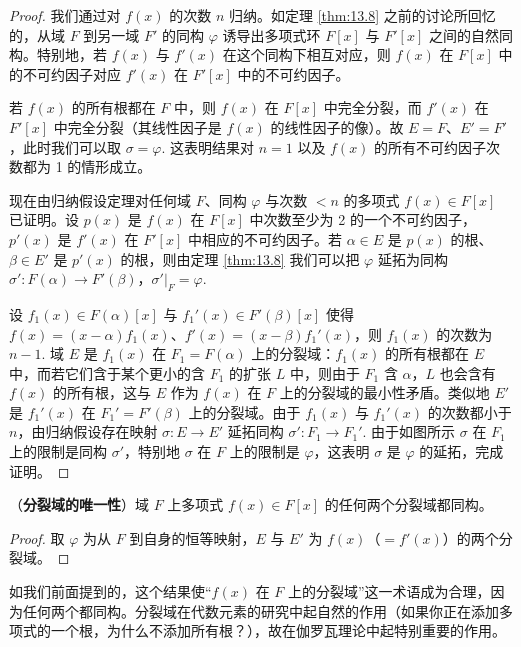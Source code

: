 \begin{proof}
我们通过对 \(f(x)\) 的次数 \(n\) 归纳。如定理 \ref{thm:13.8} 之前的讨论所回忆的，从域 \(F\) 到另一域 \(F'\) 的同构 \(\varphi\) 诱导出多项式环 \(F[x]\) 与 \(F'[x]\) 之间的自然同构。特别地，若 \(f(x)\) 与 \(f'(x)\) 在这个同构下相互对应，则 \(f(x)\) 在 \(F[x]\) 中的不可约因子对应 \(f'(x)\) 在 \(F'[x]\) 中的不可约因子。

若 \(f(x)\) 的所有根都在 \(F\) 中，则 \(f(x)\) 在 \(F[x]\) 中完全分裂，而 \(f'(x)\) 在 \(F'[x]\) 中完全分裂（其线性因子是 \(f(x)\) 的线性因子的像）。故 \(E = F\)、\(E' = F'\)，此时我们可以取 \(\sigma = \varphi\). 这表明结果对 \(n = 1\) 以及 \(f(x)\) 的所有不可约因子次数都为 1 的情形成立。

现在由归纳假设定理对任何域 \(F\)、同构 \(\varphi\) 与次数 \(< n\) 的多项式 \(f(x) \in F[x]\) 已证明。设 \(p(x)\) 是 \(f(x)\) 在 \(F[x]\) 中次数至少为 2 的一个不可约因子，\(p'(x)\) 是 \(f'(x)\) 在 \(F'[x]\) 中相应的不可约因子。若 \(\alpha \in E\) 是 \(p(x)\) 的根、\(\beta \in E'\) 是 \(p'(x)\) 的根，则由定理 \ref{thm:13.8} 我们可以把 \(\varphi\) 延拓为同构 \(\sigma' : F(\alpha) \to F'(\beta)\)，\(\sigma'|_F = \varphi\).

设 \(f_1(x) \in F(\alpha)[x]\) 与 \(f_1'(x) \in F'(\beta)[x]\) 使得 \(f(x) = (x-\alpha)f_1(x)\)、\(f'(x) = (x-\beta)f_1'(x)\)，则 \(f_1(x)\) 的次数为 \(n-1\). 域 \(E\) 是 \(f_1(x)\) 在 \(F_1 = F(\alpha)\) 上的分裂域：\(f_1(x)\) 的所有根都在 \(E\) 中，而若它们含于某个更小的含 \(F_1\) 的扩张 \(L\) 中，则由于 \(F_1\) 含 \(\alpha\)，\(L\) 也会含有 \(f(x)\) 的所有根，这与 \(E\) 作为 \(f(x)\) 在 \(F\) 上的分裂域的最小性矛盾。类似地 \(E'\) 是 \(f_1'(x)\) 在 \(F_1' = F'(\beta)\) 上的分裂域。由于 \(f_1(x)\) 与 \(f_1'(x)\) 的次数都小于 \(n\)，由归纳假设存在映射 \(\sigma : E \to E'\) 延拓同构 \(\sigma' : F_1 \to F_1'\). 由于如图所示 \(\sigma\) 在 \(F_1\) 上的限制是同构 \(\sigma'\)，特别地 \(\sigma\) 在 \(F\) 上的限制是 \(\varphi\)，这表明 \(\sigma\) 是 \(\varphi\) 的延拓，完成证明。
\end{proof}

\begin{corollary}\label{cor:13.28}
（\textbf{分裂域的唯一性}）域 \(F\) 上多项式 \(f(x) \in F[x]\) 的任何两个分裂域都同构。
\end{corollary}

\begin{proof}
取 \(\varphi\) 为从 \(F\) 到自身的恒等映射，\(E\) 与 \(E'\) 为 \(f(x)\)（\(= f'(x)\)）的两个分裂域。
\end{proof}

如我们前面提到的，这个结果使“\(f(x)\) 在 \(F\) 上的分裂域”这一术语成为合理，因为任何两个都同构。分裂域在代数元素的研究中起自然的作用（如果你正在添加多项式的一个根，为什么不添加所有根？），故在伽罗瓦理论中起特别重要的作用。

